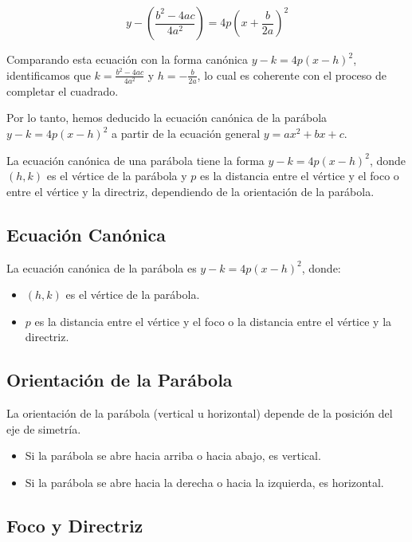 \documentclass[]{book}
\providecommand{\tightlist}{%
  \setlength{\itemsep}{0pt}\setlength{\parskip}{0pt}}
\begin{document}
\[y - \left(\frac{b^2 - 4ac}{4a^2}\right) = 4p\left(x + \frac{b}{2a}\right)^2\]

Comparando esta ecuación con la forma canónica \(y - k = 4p(x - h)^2\),
identificamos que \(k = \frac{b^2 - 4ac}{4a^2}\) y
\(h = -\frac{b}{2a}\), lo cual es coherente con el proceso de completar
el cuadrado.

Por lo tanto, hemos deducido la ecuación canónica de la parábola
\(y - k = 4p(x - h)^2\) a partir de la ecuación general
\(y = ax^2 + bx + c\).

La ecuación canónica de una parábola tiene la forma
\(y - k = 4p(x - h)^2\), donde \((h, k)\) es el vértice de la parábola y
\(p\) es la distancia entre el vértice y el foco o entre el vértice y la
directriz, dependiendo de la orientación de la parábola.

\subsection{Ecuación Canónica}\label{ecuaciuxf3n-canuxf3nica}

La ecuación canónica de la parábola es \(y - k = 4p(x - h)^2\), donde:

\begin{itemize}
\tightlist
\item
  \((h, k)\) es el vértice de la parábola.
\item
  \(p\) es la distancia entre el vértice y el foco o la distancia entre
  el vértice y la directriz.
\end{itemize}

\subsection{Orientación de la
Parábola}\label{orientaciuxf3n-de-la-paruxe1bola}

La orientación de la parábola (vertical u horizontal) depende de la
posición del eje de simetría.

\begin{itemize}
\tightlist
\item
  Si la parábola se abre hacia arriba o hacia abajo, es vertical.
\item
  Si la parábola se abre hacia la derecha o hacia la izquierda, es
  horizontal.
\end{itemize}

\subsection{Foco y Directriz}\label{foco-y-directriz}
\end{document}
